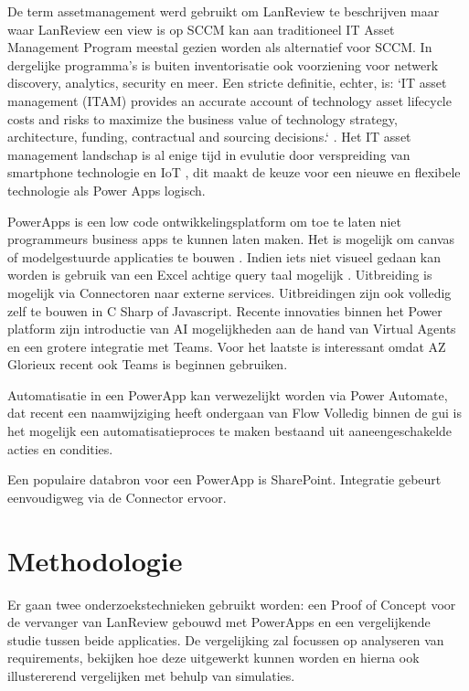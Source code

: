 De term assetmanagement werd gebruikt om LanReview te beschrijven maar waar LanReview een view is op SCCM kan aan traditioneel IT Asset Management Program meestal gezien worden als alternatief voor SCCM. In dergelijke programma's is buiten inventorisatie ook voorziening voor netwerk discovery, analytics, security en meer. Een stricte definitie, echter, is: `IT asset management (ITAM) provides an accurate account of technology asset lifecycle costs and risks to maximize the business value of technology strategy, architecture, funding, contractual and sourcing decisions.` \parencite{Gartner2020}.
Het IT asset management landschap is al enige tijd in evulutie door verspreiding van smartphone technologie en  IoT \parencite{Badnakhe2020}, dit maakt de keuze voor een nieuwe en flexibele technologie als Power Apps logisch.

PowerApps is een low code ontwikkelingsplatform om toe te laten niet programmeurs business apps te kunnen laten maken. Het is mogelijk om canvas of modelgestuurde applicaties te bouwen \parencite{Knight2019}. Indien iets niet visueel gedaan kan worden is gebruik van een Excel achtige query taal mogelijk \parencite{Owen2019}. Uitbreiding is mogelijk via Connectoren naar externe services. Uitbreidingen zijn ook volledig zelf te bouwen in C Sharp \parencite{Vivek2019} of Javascript.
Recente innovaties binnen het Power platform zijn introductie van AI mogelijkheden aan de hand van Virtual Agents en een grotere integratie met Teams. \parencite{Cunningham2019} Voor het laatste is interessant omdat AZ Glorieux recent ook Teams is beginnen gebruiken.

Automatisatie in een PowerApp kan verwezelijkt worden via Power Automate, dat recent een naamwijziging heeft ondergaan van Flow \parencite{Weare2019} Volledig binnen de gui is het mogelijk een automatisatieproces te maken bestaand uit aaneengeschakelde acties en condities.

Een populaire databron voor een PowerApp is SharePoint. Integratie gebeurt eenvoudigweg via de Connector ervoor. \parencite{Owen2019a}


\section{Methodologie}
\label{sec:methodologie}

Er gaan twee onderzoekstechnieken gebruikt worden: een Proof of Concept voor de vervanger van LanReview gebouwd met PowerApps en een vergelijkende studie tussen beide applicaties. De vergelijking zal focussen op analyseren van requirements, bekijken hoe deze uitgewerkt kunnen worden en hierna ook illustererend vergelijken met behulp van simulaties.

